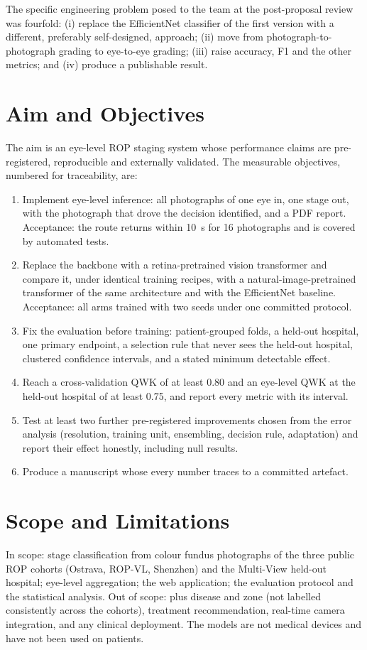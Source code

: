 The specific engineering problem posed to the team at the post-proposal review was fourfold: (i) replace the EfficientNet classifier of the first version with a different, preferably self-designed, approach; (ii) move from photograph-to-photograph grading to eye-to-eye grading; (iii) raise accuracy, F1 and the other metrics; and (iv) produce a publishable result.

\section{Aim and Objectives}
The aim is an eye-level ROP staging system whose performance claims are pre-registered, reproducible and externally validated. The measurable objectives, numbered for traceability, are:
\begin{enumerate}
\item[O1] Implement eye-level inference: all photographs of one eye in, one stage out, with the photograph that drove the decision identified, and a PDF report. Acceptance: the route returns within 10~s for 16 photographs and is covered by automated tests.
\item[O2] Replace the backbone with a retina-pretrained vision transformer and compare it, under identical training recipes, with a natural-image-pretrained transformer of the same architecture and with the EfficientNet baseline. Acceptance: all arms trained with two seeds under one committed protocol.
\item[O3] Fix the evaluation before training: patient-grouped folds, a held-out hospital, one primary endpoint, a selection rule that never sees the held-out hospital, clustered confidence intervals, and a stated minimum detectable effect.
\item[O4] Reach a cross-validation QWK of at least 0.80 and an eye-level QWK at the held-out hospital of at least 0.75, and report every metric with its interval.
\item[O5] Test at least two further pre-registered improvements chosen from the error analysis (resolution, training unit, ensembling, decision rule, adaptation) and report their effect honestly, including null results.
\item[O6] Produce a manuscript whose every number traces to a committed artefact.
\end{enumerate}

\section{Scope and Limitations}
In scope: stage classification from colour fundus photographs of the three public ROP cohorts (Ostrava, ROP-VL, Shenzhen) and the Multi-View held-out hospital; eye-level aggregation; the web application; the evaluation protocol and the statistical analysis. Out of scope: plus disease and zone (not labelled consistently across the cohorts), treatment recommendation, real-time camera integration, and any clinical deployment. The models are not medical devices and have not been used on patients.

